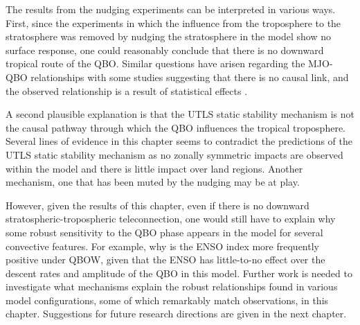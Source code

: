 The results from the nudging experiments can be interpreted in various ways. 
First, since the experiments in which the influence from the troposphere to the stratosphere was removed by nudging the stratosphere in the model show no surface response, one could reasonably conclude that there is no downward tropical route of the QBO. 
Similar questions have arisen regarding the MJO-QBO relationships with some studies suggesting that there is no causal link, and the observed relationship is a result of statistical effects \citep{wang2019}. 

A second plausible explanation is that the UTLS static stability mechanism is not the causal pathway through which the QBO influences the tropical troposphere. 
Several lines of evidence in this chapter seems to contradict the predictions of the UTLS static stability mechanism as no zonally symmetric impacts are observed within the model and there is little impact over land regions. 
Another mechanism, one that has been muted by the nudging may be at play. 

However, given the results of this chapter, even if there is no downward stratospheric-tropospheric teleconnection, one would still have to explain why some robust sensitivity to the QBO phase appears in the model for several convective features. For example, why is the ENSO index more frequently positive under QBOW, given that the ENSO has little-to-no effect over the descent rates and amplitude of the QBO \citep{serva2020} in this model. 
Further work is needed to investigate what mechanisms explain the robust relationships found in various model configurations, some of which remarkably match observations, in this chapter. Suggestions for future research directions are given in the next chapter.


